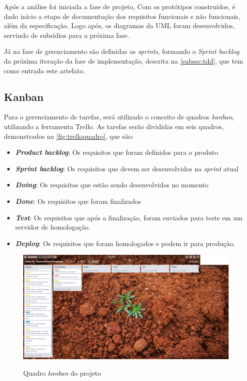 Após a análise foi iniciada a fase de projeto, Com os protótipos construídos, é dado início a etapa de documentação dos requisitos funcionais e não funcionais, além da especificação. Logo após, os diagramas da UML foram desenvolvidos, servindo de subsídios para a próxima fase.

Já na fase de gerenciamento são definidas as \textit{sprints}, formando o \textit{Sprint backlog} da próxima iteração da fase de implementação, descrita na \autoref{subsec:tdd}, que tem como entrada este artefato.

\subsection{Kanban}
\label{subsec:kanban}

Para o gerenciamento de tarefas, será utilizado o conceito de quadros \textit{kanban}, utilizando a ferramenta Trello. As tarefas serão divididas em seis quadros, demonstrados na \autoref{fig:trelloquadro}, que são:

\begin{itemize}
    \item \textbf{\textit{Product backlog}}: Os requisitos que foram definidos para o produto
    \item \textbf{\textit{Sprint backlog}}: Os requisitos que devem ser desenvolvidos na \textit{sprint} atual
    \item \textbf{\textit{Doing}}: Os requisitos que estão sendo desenvolvidos no momento
    \item \textbf{\textit{Done}}: Os requisitos que foram finalizados
    \item \textbf{\textit{Test}}: Os requisitos que após a finalização, foram enviados para teste em um servidor de homologação.
    \item \textbf{\textit{Deploy}}: Os requisitos que foram homologados e podem ir para produção.
\end{itemize}

\begin{figure}[H]
    \centering
    \caption{Quadro \textit{kanban} do projeto}
    \includegraphics[width=13cm]{dados/figuras/quadro_trello.png}
    \label{fig:trelloquadro}
\end{figure}


